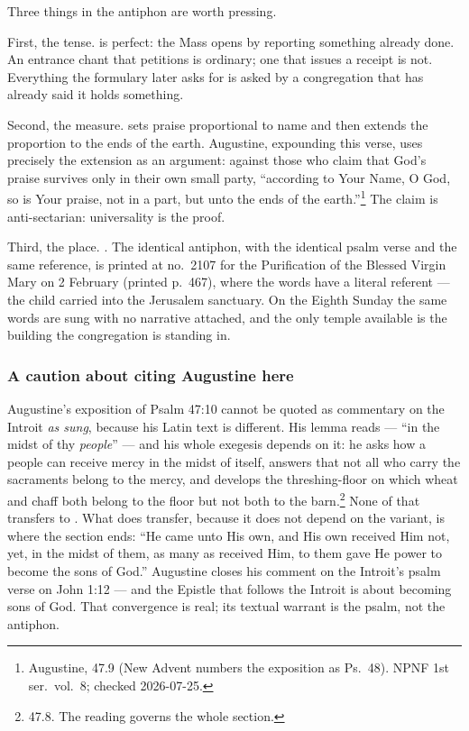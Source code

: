 Three things in the antiphon are worth pressing.

First, the tense.  is perfect: the Mass opens by reporting
something already done. An entrance chant that petitions is ordinary; one that
issues a receipt is not. Everything the formulary later asks for is asked by a
congregation that has already said it holds something.

Second, the measure.  sets praise proportional to name and then extends the proportion to
the ends of the earth. Augustine, expounding this verse, uses precisely the
extension as an argument: against those who claim that God's praise survives
only in their own small party, ``according to Your Name, O God, so is Your
praise, not in a part, but unto the ends of the earth.''\footnote{Augustine,
 47.9 (New Advent numbers the exposition as Ps.\
48). NPNF 1st ser.\ vol.\ 8; checked 2026-07-25.} The claim is anti-sectarian:
universality is the proof.

Third, the place. . The identical antiphon, with the
identical psalm verse and the same reference, is printed at no.\ 2107 for the
Purification of the Blessed Virgin Mary on 2 February (printed p.\ 467), where
the words have a literal referent --- the child carried into the Jerusalem
sanctuary. On the Eighth Sunday the same words are sung with no narrative
attached, and the only temple available is the building the congregation is
standing in.

\subsubsection*{A caution about citing Augustine here}

Augustine's exposition of Psalm 47:10 cannot be quoted as commentary on the
Introit \emph{as sung}, because his Latin text is different. His lemma reads
\latin{in medio populi tui} --- ``in the midst of thy \emph{people}'' --- and
his whole exegesis depends on it: he asks how a people can receive mercy in the
midst of itself, answers that not all who carry the sacraments belong to the
mercy, and develops the threshing-floor on which wheat and chaff both belong to
the floor but not both to the barn.\footnote{\work{Enarr.\ in Ps.} 47.8. The
reading \latin{in medio populi tui} governs the whole section.} None of that
transfers to \latin{templi}. What does transfer, because it does not depend on
the variant, is where the section ends: ``He came unto His own, and His own
received Him not, yet, in the midst of them, as many as received Him, to them
gave He power to become the sons of God.'' Augustine closes his comment on the
Introit's psalm verse on John 1:12 --- and the Epistle that follows the Introit
is about becoming sons of God. That convergence is real; its textual warrant is
the psalm, not the antiphon.

